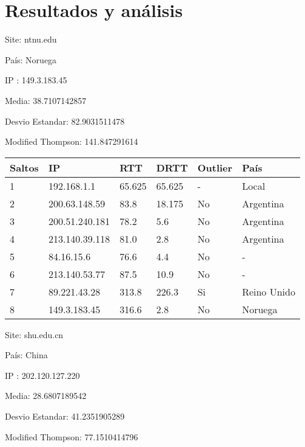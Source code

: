 \section{Resultados y análisis}

Site: ntnu.edu

País: Noruega

IP : 149.3.183.45

Media: 38.7107142857 

Desvio Estandar: 82.9031511478 

Modified Thompson: 141.847291614

\begin{center}
    \begin{tabular}{| l | l | l | l | l | l | }
    \hline
    Saltos & IP             & RTT    & DRTT   & Outlier & País        \\ \hline
    1      & 192.168.1.1    & 65.625 & 65.625 & -       & Local       \\ \hline
    2      & 200.63.148.59  & 83.8   & 18.175 & No      & Argentina   \\ \hline
    3      & 200.51.240.181 & 78.2   & 5.6    & No      & Argentina   \\ \hline
    4      & 213.140.39.118 & 81.0   & 2.8    & No      & Argentina   \\ \hline
    5      & 84.16.15.6     & 76.6   & 4.4    & No      & -           \\ \hline
    6      & 213.140.53.77  & 87.5   & 10.9   & No      & -           \\ \hline
    7      & 89.221.43.28   & 313.8  & 226.3  & Si      & Reino Unido \\ \hline
    8      & 149.3.183.45   & 316.6  & 2.8    & No      & Noruega     \\ \hline
    \end{tabular}
\end{center}

Site: shu.edu.cn

País: China

IP : 202.120.127.220

Media: 28.6807189542 

Desvio Estandar: 41.2351905289 

Modified Thompson: 77.1510414796

